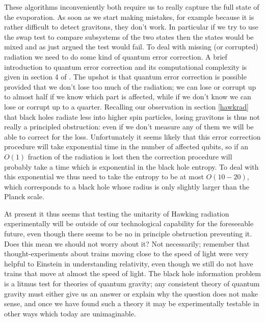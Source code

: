 \documentclass[12pt]{article}
\begin{document}
These algorithms inconveniently both require us to really capture the full state of the evaporation.  As soon as we start making mistakes, for example because it is rather difficult to detect gravitons, they don't work.  In particular if we try to use the swap test to compare subsystems of the two states then the states would be mixed and as just argued the test would fail.  To deal with missing (or corrupted) radiation we need to do some kind of quantum error correction.  A brief introduction to quantum error correction and its computational complexity is given in section 4 of \cite{Harlow:2013tf}.  The upshot is that quantum error correction is possible provided that we don't lose too much of the radiation; we can lose or corrupt up to almost half if we know which part is affected, while if we don't know we can lose or corrupt up to a quarter.  Recalling our observation in section \ref{hawkrad} that black holes radiate less into higher spin particles, losing gravitons is thus not really a principled obstruction: even if we don't measure any of them we will be able to correct for the loss.  Unfortunately it seems likely that this error correction procedure will take exponential time in the number of affected qubits, so if an $O(1)$ fraction of the radiation is lost then the correction procedure will probably take a time which is exponential in the black hole entropy.  To deal with this exponential we thus need to take the entropy to be at most $O(10-20)$, which corresponds to a black hole whose radius is only slightly larger than the Planck scale.  

At present it thus seems that testing the unitarity of Hawking radiation experimentally will be outside of our technological capability for the foreseeable future, even though there seems to be no in principle obstruction preventing it.  Does this mean we should not worry about it?  Not necessarily; remember that thought-experiments about trains moving close to the speed of light were very helpful to Einstein in understanding relativity, even though we still do not have trains that move at almost the speed of light.  The black hole information problem is a litmus test for theories of quantum gravity; any consistent theory of quantum gravity must either give us an answer or explain why the question does not make sense, and once we have found such a theory it may be experimentally testable in other ways which today are unimaginable.  
  
\end{document}
